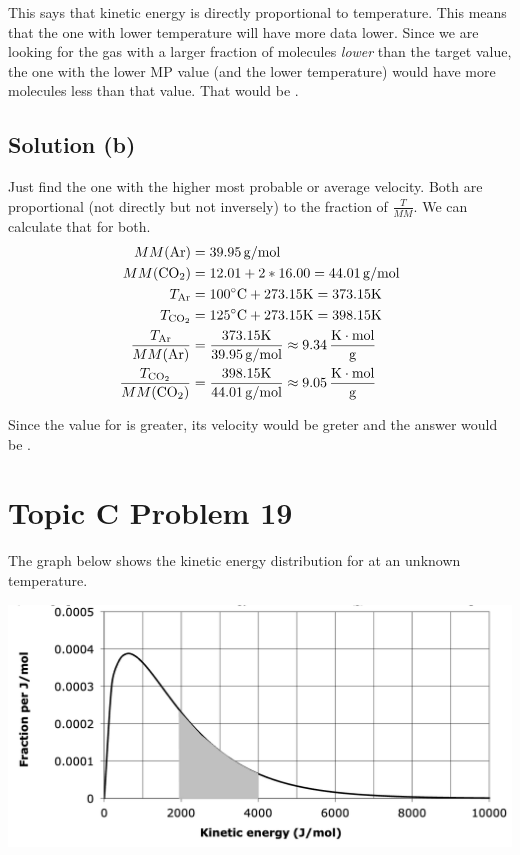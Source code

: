 \documentclass[10pt]{article}
\begin{document}
            This says that kinetic energy is directly proportional to temperature. 
            This means that the one with lower temperature will have more data lower.
            Since we are looking for the gas with a larger fraction of molecules \textit{lower} than the target value, the one with the lower MP value (and the lower temperature) would have more molecules less than that value.
            That would be . 

        \subsection{Solution (b)}
            Just find the one with the higher most probable or average velocity.
            Both are proportional (not directly but not inversely) to the fraction of $\frac{T}{MM}$. 
            We can calculate that for both.
            \begin{align}
                MM(\ce{Ar}) &=  39.95\,\unit{\gram/\mole}\\
                MM(\ce{CO2})&=  12.01 + 2 * 16.00
                    =   44.01\,\unit{\gram/\mole}\\
                T_{\ce{Ar}} &=  100\unit{\celsius} + 273.15\unit{\kelvin}
                    =   373.15\unit{\kelvin}\\
                T_{\ce{CO2}}&=  125\unit{\celsius} + 273.15\unit{\kelvin}
                    =   398.15\unit{\kelvin}\\
                \frac{T_{\ce{Ar}}}{MM(\ce{Ar})} &=  \frac{373.15\unit{\kelvin}}{39.95\,\unit{\gram/\mole}}
                    \approx 9.34\,\unit{\frac{\kelvin\cdot\mole}{\gram}}\\
                \frac{T_{\ce{CO2}}}{MM(\ce{CO2})}   &=  \frac{398.15\unit{\kelvin}}{44.01\,\unit{\gram/\mole}}
                    \approx 9.05\,\unit{\frac{\kelvin\cdot\mole}{\gram}}
            \end{align}

            Since the value for  is greater, its velocity would be greter and the answer would be . 

    \pagebreak
    \section{Topic C Problem 19}
        The graph below shows the kinetic energy distribution for  at an unknown temperature.
        \begin{center}
            \includegraphics[width=\textwidth]{picture_C-19.png}
        \end{center}
        
\end{document}
